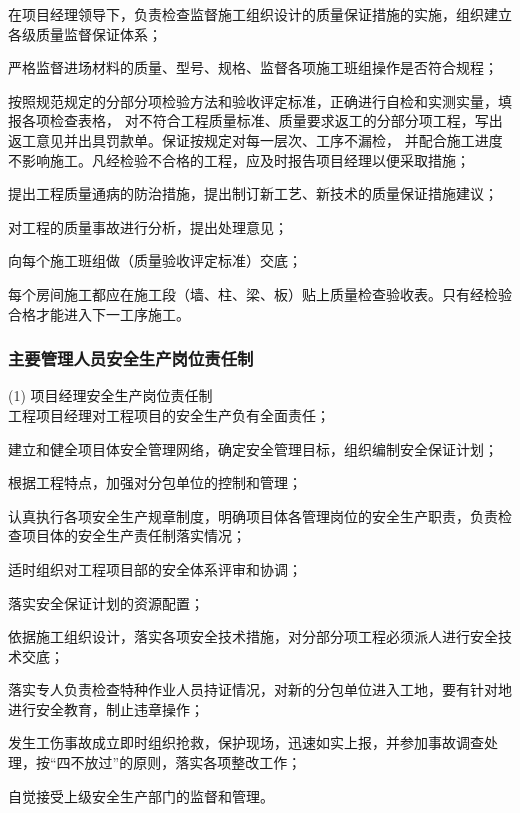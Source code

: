  在项目经理领导下，负责检查监督施工组织设计的质量保证措施的实施，组织建立各级质量监督保证体系；

 严格监督进场材料的质量、型号、规格、监督各项施工班组操作是否符合规程；

 按照规范规定的分部分项检验方法和验收评定标准，正确进行自检和实测实量，填报各项检查表格，
对不符合工程质量标准、质量要求返工的分部分项工程，写出返工意见并出具罚款单。保证按规定对每一层次、工序不漏检，
并配合施工进度不影响施工。凡经检验不合格的工程，应及时报告项目经理以便采取措施；

 提出工程质量通病的防治措施，提出制订新工艺、新技术的质量保证措施建议；

 对工程的质量事故进行分析，提出处理意见；

 向每个施工班组做（质量验收评定标准）交底；

 每个房间施工都应在施工段（墙、柱、梁、板）贴上质量检查验收表。只有经检验合格才能进入下一工序施工。 \\

\subsubsection{主要管理人员安全生产岗位责任制}

(1) 项目经理安全生产岗位责任制\\

 工程项目经理对工程项目的安全生产负有全面责任；

 建立和健全项目体安全管理网络，确定安全管理目标，组织编制安全保证计划；

 根据工程特点，加强对分包单位的控制和管理；

 认真执行各项安全生产规章制度，明确项目体各管理岗位的安全生产职责，负责检查项目体的安全生产责任制落实情况；

 适时组织对工程项目部的安全体系评审和协调；

 落实安全保证计划的资源配置；

 依据施工组织设计，落实各项安全技术措施，对分部分项工程必须派人进行安全技术交底；

 落实专人负责检查特种作业人员持证情况，对新的分包单位进入工地，要有针对地进行安全教育，制止违章操作；

 发生工伤事故成立即时组织抢救，保护现场，迅速如实上报，并参加事故调查处理，按“四不放过”的原则，落实各项整改工作；

 自觉接受上级安全生产部门的监督和管理。\\

